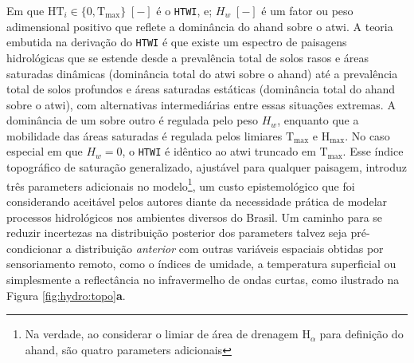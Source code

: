 \documentclass[./main.tex]{subfiles}
\begin{document}
Em que $\text{HT}_{i}\in \{0,\text{T}_\text{max}\}\;[-]$ é o \texttt{HTWI}, e; $H_w\;[-]$ é um fator ou peso adimensional positivo que reflete a dominância do \acrshort{ahand} sobre o \acrshort{atwi}. A \gls{teoria} embutida na derivação do \texttt{HTWI} é que existe um espectro de paisagens hidrológicas que se estende desde a prevalência total de solos rasos e áreas saturadas dinâmicas (dominância total do \acrshort{atwi} sobre o \acrshort{ahand}) até a prevalência total de solos profundos e áreas saturadas estáticas (dominância total do \acrshort{ahand} sobre o \acrshort{atwi}), com alternativas intermediárias entre essas situações extremas. A dominância de um sobre outro é regulada pelo peso $H_w$, enquanto que a mobilidade das áreas saturadas é regulada pelos limiares $\text{T}_\text{max}$ e $\text{H}_\text{max}$. No caso especial em que $H_w = 0$, o \texttt{HTWI} é idêntico ao \acrshort{atwi} truncado em $\text{T}_\text{max}$. Esse índice topográfico de saturação generalizado, ajustável para qualquer paisagem, introduz três \gls{parameters} adicionais no modelo\footnote{Na verdade, ao considerar o limiar de área de drenagem $\text{H}_{\alpha}$ para definição do \acrshort{ahand}, são quatro \gls{parameters} adicionais}, um custo epistemológico que foi considerando aceitável pelos autores diante da necessidade prática de modelar processos hidrológicos nos ambientes diversos do Brasil. Um caminho para se reduzir incertezas na distribuição posterior dos \gls{parameters} talvez seja pré-condicionar a distribuição \textit{anterior} com outras variáveis espaciais obtidas por sensoriamento remoto, como o índices de umidade, a temperatura superficial ou simplesmente a reflectância no infravermelho de ondas curtas, como ilustrado na Figura \ref{fig:hydro:topo}\textbf{a}.
\end{document}
